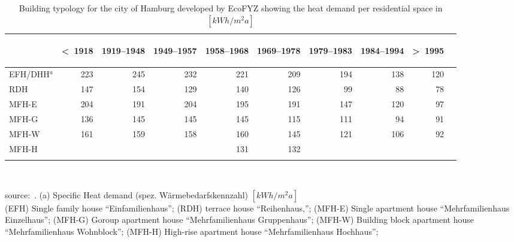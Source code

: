 \begin{table}[htbp]
  \centering
  \caption{Building typology for the city of Hamburg developed by EcoFYZ
      showing the heat demand per residential space in
  $[kWh/m^2a]$}\label{tab:EcoFYZ}%
  \begin{tabular}{l r rrr rrr rr}
    \addlinespace
    \toprule
    &
    \begin{sideways}\textless~1918\end{sideways}&  %
    \begin{sideways}1919--1948\end{sideways}&     %
    \begin{sideways}1949--1957\end{sideways}&     %
    \begin{sideways}1958--1968\end{sideways}&     %
    \begin{sideways}1969--1978\end{sideways}&     %
    \begin{sideways}1979--1983\end{sideways}&     %
    \begin{sideways}1984--1994\end{sideways}&     %
    \begin{sideways}\textgreater~1995\end{sideways}\\    %
    \midrule
EFH/DHH$^a$  &223 & 245 & 232& 221& 209& 194& 138& 120\\
RDH          &147 & 154 & 129& 140& 126& 99 & 88 & 78\\
MFH-E        &204 & 191 & 204& 195& 191& 147& 120& 97\\
MFH-G        &136 & 145 & 145& 145& 115& 111& 94 & 91\\
MFH-W  	  &161 & 159 & 158& 160& 145& 121& 106& 92\\
MFH-H        &    &     &    & 131& 132\\
    \bottomrule
    \addlinespace
    \end{tabular}\\
    \begin{footnotesize}
        source:~\cite[pp.~18]{Hermelink.2011}.
    (a) Specific Heat demand (spez. W\"armebedarfskennzahl)
    $[kWh/m^{2}a]$\\
(EFH) Single family house ``Einfamilienhaus'';
(RDH) terrace house ``Reihenhaus,'';
(MFH-E) Single apartment house ``Mehrfamilienhaus Einzelhaus'';
(MFH-G) Goroup apartment house ``Mehrfamilienhaus Gruppenhaus'';
(MFH-W) Building block apartment house ``Mehrfamilienhaus Wohnblock'';
(MFH-H) High-rise apartment house ``Mehrfamilienhaus Hochhaus'';
    \end{footnotesize}
\end{table}
